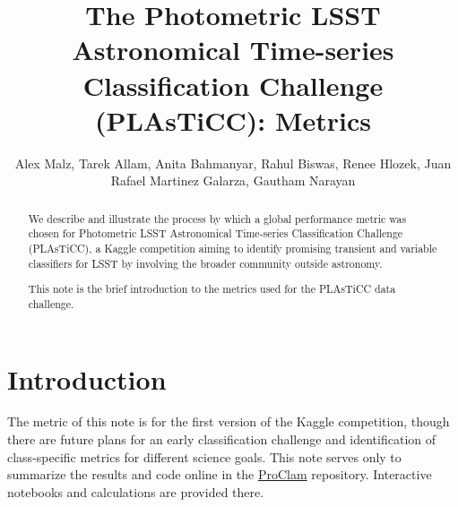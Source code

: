 \documentclass[\docopts]{\docclass}
\author{Alex Malz, Tarek Allam, Anita Bahmanyar, Rahul Biswas, Renee Hlozek, Juan Rafael Martinez Galarza, Gautham Narayan}
\begin{document}
\title{The Photometric LSST Astronomical Time-series Classification Challenge (PLAsTiCC): Metrics}

\maketitlepre

\begin{abstract}
We describe and illustrate the process by which a global performance metric was chosen for Photometric LSST Astronomical Time-series Classification Challenge (PLAsTiCC), a Kaggle competition aiming to identify promising transient and variable classifiers for LSST by involving the broader community outside astronomy.

This note is the brief introduction to the metrics used for the PLAsTiCC data challenge.
\end{abstract}

\dockeys{}

\maketitlepost


\section{Introduction}
\label{sec:intro}

The metric of this note is for the first version of the Kaggle competition, though there are future plans for an early classification challenge and identification of class-specific metrics for different science goals. This note serves only to summarize the results and code online in the \href{https://github.com/aimalz/proclam/}{ProClam} repository. Interactive notebooks and calculations are provided there.
\end{document}
